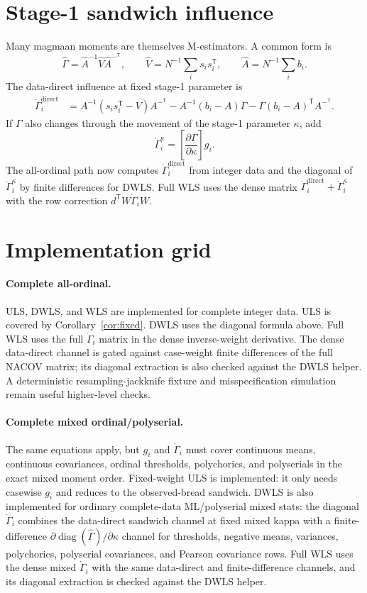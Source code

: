 \documentclass[11pt]{article}
\newcommand{\diag}{\operatorname{diag}}
\newcommand{\T}{^{\mathsf T}}
\theoremstyle{plain}
\theoremstyle{remark}
\begin{document}
\section{Stage-1 sandwich influence}

Many magmaan moments are themselves M-estimators. A common form is
\[
  \hat\Gamma = \hat A^{-1}\hat V\hat A^{-\T},
  \qquad
  \hat V=N^{-1}\sum_i s_i s_i\T,\qquad
  \hat A=N^{-1}\sum_i b_i .
\]
The data-direct influence at fixed stage-1 parameter is
\begin{align*}
  \dot\Gamma_i^{\mathrm{direct}}
  &=
  A^{-1}(s_is_i\T-V)A^{-\T}
  - A^{-1}(b_i-A)\Gamma
  - \Gamma(b_i-A)\T A^{-\T}.
\end{align*}
If $\Gamma$ also changes through the movement of the stage-1 parameter
$\kappa$, add
\[
  \dot\Gamma_i^{\kappa} =
  \left[\frac{\partial \Gamma}{\partial\kappa}\right] g_i .
\]
The all-ordinal path now computes
$\dot\Gamma_i^{\mathrm{direct}}$ from integer data and the diagonal of
$\dot\Gamma_i^\kappa$ by finite differences for DWLS. Full WLS uses the dense
matrix $\dot\Gamma_i^{\mathrm{direct}}+\dot\Gamma_i^\kappa$ with the row
correction $d\T W\dot\Gamma_i W$.

\section{Implementation grid}

\paragraph{Complete all-ordinal.}
ULS, DWLS, and WLS are implemented for complete integer data. ULS is covered by
Corollary~\ref{cor:fixed}. DWLS uses the diagonal formula above. Full WLS uses
the full $\dot\Gamma_i$ matrix in the dense inverse-weight derivative. The dense
data-direct channel is gated against case-weight finite differences of the full
NACOV matrix; its diagonal extraction is also checked against the DWLS helper.
A deterministic resampling-jackknife fixture and misspecification simulation
remain useful higher-level checks.

\paragraph{Complete mixed ordinal/polyserial.}
The same equations apply, but $g_i$ and $\dot\Gamma_i$ must cover continuous
means, continuous covariances, ordinal thresholds, polychorics, and polyserials
in the exact mixed moment order. Fixed-weight ULS is implemented: it only needs
casewise $g_i$ and reduces to the observed-bread sandwich. DWLS is also
implemented for ordinary complete-data ML/polyserial mixed stats: the diagonal
$\dot\Gamma_i$ combines the data-direct sandwich channel at fixed mixed kappa
with a finite-difference $\partial\diag(\hat\Gamma)/\partial\kappa$ channel for
thresholds, negative means, variances, polychorics, polyserial covariances, and
Pearson covariance rows. Full WLS uses the dense mixed $\dot\Gamma_i$ with the
same data-direct and finite-difference channels, and its diagonal extraction is
checked against the DWLS helper.
\end{document}

